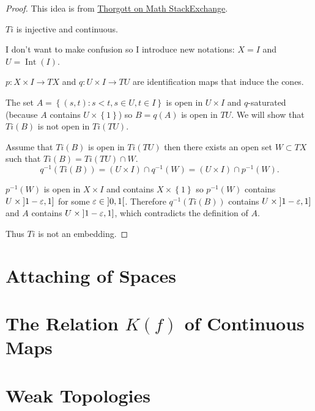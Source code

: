 \begin{proof}
	This idea is from \href{https://math.stackexchange.com/a/4879627}{Thorgott on Math StackExchange}.

	\( Ti \) is injective and continuous.

	I don't want to make confusion so I introduce new notations: \( X = I \) and \( U = \operatorname{Int}(I) \).

	\( p: X \times I \to TX \) and \( q: U \times I \to TU \) are identification maps that induce the cones.

	The set \( A = \left\{ (s, t): s < t, s \in U, t \in I \right\} \) is open in \( U \times I \) and \( q \)-saturated (because \( A \) contains \( U \times \left\{ 1 \right\} \)) so \( B = q(A) \) is open in \( TU \). We will show that \( Ti(B) \) is not open in \( Ti(TU) \).

	Assume that \( Ti(B) \) is open in \( Ti(TU) \) then there exists an open set \( W \subset TX \) such that \( Ti(B) = Ti(TU) \cap W \).
	\[
		q^{-1}(Ti(B)) = (U \times I) \cap q^{-1}(W) = (U \times I) \cap p^{-1}(W).
	\]

	\( p^{-1}(W) \) is open in \( X \times I \) and contains \( X \times \left\{ 1 \right\} \) so \( p^{-1}(W) \) contains \( U \times \left\rbrack{1 - \varepsilon, 1}\right\rbrack \) for some \( \varepsilon \in \left\rbrack{0, 1}\right\lbrack \). Therefore \( q^{-1}(Ti(B)) \) contains \( U \times \left\rbrack{1 - \varepsilon, 1}\right\rbrack \) and \( A \) contains \( U \times \left\rbrack{1 - \varepsilon, 1}\right\rbrack \), which contradicts the definition of \( A \).

	Thus \( Ti \) is not an embedding.
\end{proof}

\section{Attaching of Spaces}

\section{The Relation \(K(f)\) of Continuous Maps}

\section{Weak Topologies}
